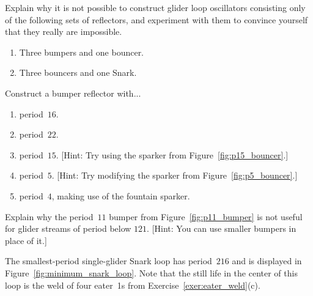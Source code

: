 \begin{multicols}{2}
\mfilbreak


\begin{problem}\label{exer:bumper_bouncer_wrong_color}
	Explain why it is not possible to construct glider loop oscillators consisting only of the following sets of reflectors, and experiment with them to convince yourself that they really are impossible.\smallskip
	
	\begin{enumerate}[label=\bf\color{ocre}(\alph*)]
		\item Three bumpers and one bouncer.
		
		\item Three bouncers and one Snark.
	\end{enumerate}
\end{problem}


\mfilbreak


\begin{problem}\label{exer:bumper_high_period}
	Construct a bumper reflector with...\smallskip
	
	\begin{enumerate}[label=\bf\color{ocre}(\alph*)]
		\item period~$16$.
		
		\item period~$22$.
		
		\item period~$15$. [Hint: Try using the sparker from Figure~\ref{fig:p15_bouncer}.]
		
		\item period~$5$. [Hint: Try modifying the sparker from Figure~\ref{fig:p5_bouncer}.]
		
		\item period~$4$, making use of the fountain sparker. %
	\end{enumerate}
\end{problem}


\mfilbreak


\begin{problem}\label{exer:p11_bumper_not_useful}
	Explain why the period~$11$ bumper from Figure~\ref{fig:p11_bumper} is not useful for glider streams of period below $121$. [Hint: You can use smaller bumpers in place of it.]
\end{problem}


\mfilbreak


\begin{problem}\label{exer:minimum_period_snark_loop}
	The smallest-period single-glider Snark loop has period~$216$ and is displayed in Figure~\ref{fig:minimum_snark_loop}. Note that the still life in the center of this loop is the weld of four eater~1s from Exercise~\ref{exer:eater_weld}(c).\smallskip
	

\end{problem}
\end{multicols}
